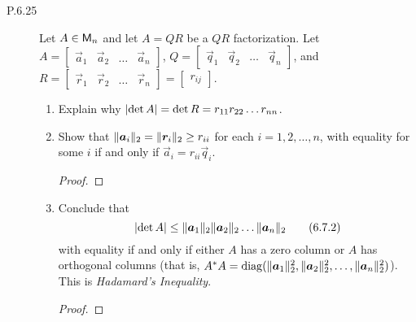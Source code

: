 \documentclass{../homework}
\date{Tuesday 2/19}
\author{}
\begin{document}
\begin{description}
\item[P.6.25] Let \(A \in \mathsf{M}_n\) and let \(A = QR\) be a \(QR\)
  factorization.  Let
  \(
  A =
  \begin{bmatrix}
    \vec a_1 & \vec a_2 & \dots & \vec a_n
  \end{bmatrix}
  \),
  \(
  Q =
  \begin{bmatrix}
    \vec q_1 & \vec q_2 & \dots & \vec q_n
  \end{bmatrix}
  \),
  and
  \(
  R =
  \begin{bmatrix}
    \vec r_1 & \vec r_2 & \dots & \vec r_n
  \end{bmatrix}
  =
  \begin{bmatrix} r_{ij} \end{bmatrix}
  \).
  \begin{enumerate}
  \item Explain why
    \(\lvert {\det A} \rvert = \det R = r_{11} r_{22} \dots r_{nn}\).

    \begin{solution}

    \end{solution}

  \item Show that \(\norm{\vec a_i}_2 = \norm{\vec r_i}_2 \ge r_{ii}\)
    for each \(i = 1, 2, \dots, n\), with equality for some \(i\) if
    and only if \(\vec a_i = r_{ii} \vec q_i\).

    \begin{solution}
      \begin{proof}

      \end{proof}
    \end{solution}

  \item Conclude that
    \[
      \abs{\det A} \le \norm{\vec a_1}_2 \norm{\vec a_2}_2
      \dots \norm{\vec a_n}_2
      \tag{6.7.2}
    \]
    with equality if and only if either \(A\) has a zero column or
    \(A\) has orthogonal columns (that is,
    \(A^* A = \diag (\norm{\vec a_1}_2^2, \norm{\vec a_2}_2^2, \dots,
    \norm{\vec a_n}_2^2)\)).  This is \textit{Hadamard's Inequality}.

    \begin{solution}
      \begin{proof}

      \end{proof}
    \end{solution}
  \end{enumerate}


\end{description}
\end{document}
